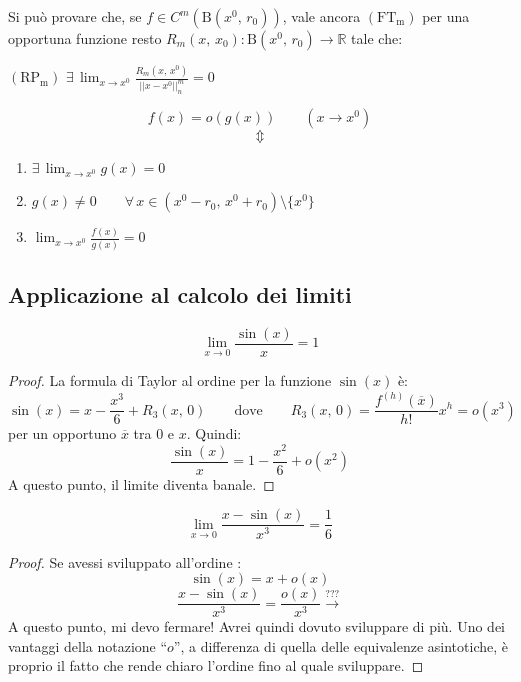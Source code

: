 \begin{obs}
Si può provare che, se $f \in C^m(\mathrm{B}(x^0,\,r_0))$, vale ancora $\mathrm{(FT_m)}$ per una opportuna funzione resto $R_m(x,\,x_0) : \mathrm{B}(x^0,\,r_0) \rightarrow \mathbb{R}$ tale che:
\begin{center}
$\mathrm{(RP_m)}$
\hfill
$\displaystyle \exists \, \lim_{x \rightarrow x^0} \frac{R_m(x,\,x^0)}{||x-x^0||_n^m} = 0$
\hfill \null \\
\end{center}
\end{obs}

\begin{obs}
$$f(x) = o(g(x)) \qquad (x \rightarrow x^0)$$
$$\Updownarrow$$
\begin{enumerate}[labelindent=\parindent,leftmargin=*,label=\textnormal{(\arabic*)},start=1]
\item $\displaystyle \exists \, \lim_{x \rightarrow x^0} g(x) = 0$
\item $\displaystyle  g(x) \neq 0 \qquad \forall \, x \in (x^0-r_0,\,x^0+r_0) \setminus \lbrace x^0 \rbrace$
\item $\displaystyle \lim_{x \rightarrow x^0} \frac{f(x)}{g(x)} = 0$
\end{enumerate}
\end{obs}

\subsection{Applicazione al calcolo dei limiti}
\begin{example}[i]
$$\lim_{x \rightarrow 0} \frac{\sin(x)}{x} = 1$$
\end{example}
\begin{proof}
La formula di Taylor al  ordine per la funzione $\sin(x)$ è:
$$\sin(x) = x - \frac{x^3}{6} + R_3(x,\,0) \qquad \text{dove} \qquad R_3(x,\,0) = \frac{f^{(h)}(\overline{x})}{h!}x^h = o(x^3)$$
per un opportuno $\overline{x}$ tra $0$ e $x$. Quindi:
$$\frac{\sin(x)}{x} = 1 - \frac{x^2}{6} + o(x^2)$$
A questo punto, il limite diventa banale.
\end{proof}

\begin{example}[ii]
$$\lim_{x \rightarrow 0} \frac{x-\sin(x)}{x^3} = \frac{1}{6}$$
\end{example}
\begin{proof}
Se avessi sviluppato all'ordine :
$$\sin(x) = x + o(x)$$
$$\frac{x-\sin(x)}{x^3} = \frac{o(x)}{x^3} \overset{???}{\longrightarrow}$$
A questo punto, mi devo fermare! Avrei quindi dovuto sviluppare di più. Uno dei vantaggi della notazione ``$o$'', a differenza di quella delle equivalenze asintotiche, è proprio il fatto che rende chiaro l'ordine fino al quale sviluppare.
\end{proof}


